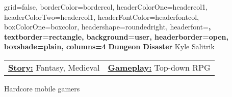 \documentclass[archE1,portrait]{baposter}
\begin{document}
\background{ %

}

\begin{poster}
{
	grid=false,
	borderColor=bordercol, %
	headerColorOne=headercol1, %
	headerColorTwo=headercol1, %
	headerFontColor=headerfontcol, %
	boxColorOne=boxcolor, %
	headershape=roundedright, %
	headerfont=\Large\sf\bf, %
	textborder=rectangle,
	background=user,
	headerborder=open, %
	boxshade=plain,
	columns=4
}
{}
%
%
{
\sf\bf Dungeon Disaster} %
{\vspace{.5em} Kyle Salitrik\\ %
} %
%




{ 
	\begin{tabularx}{\textwidth}{ X | X }
	\underline{\textbf{Story:}} Fantasy, Medieval & \underline{\textbf{Gameplay:}} Top-down RPG
	\end{tabularx}
	\vspace*{-.6\baselineskip}
}


{ 
	Hardcore mobile gamers
}


\end{poster}
\end{document}
